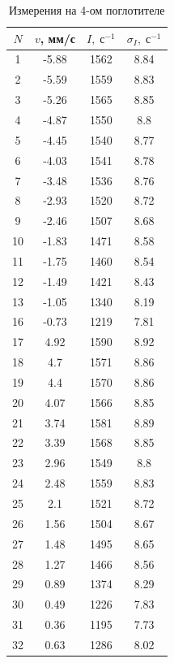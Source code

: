 \documentclass[12pt]{kiarticle}
\begin{document}
	\begin{table}[h!]
		\caption{Измерения на 4-ом поглотителе}
		\begin{center}
			\begin{tabular}{|c|c|c|c|}
				\hline
				$ N  $ & $ v $, мм/с &  $ I, \; с^{-1} $ & $ \sigma_I, \; с^{-1} $  \\
				\hline
				1 & -5.88 & 1562 & 8.84 \\
				2 & -5.59 & 1559 & 8.83 \\
				3 & -5.26 & 1565 & 8.85 \\
				4 & -4.87 & 1550 & 8.8 \\
				5 & -4.45 & 1540 & 8.77 \\
				6 & -4.03 & 1541 & 8.78 \\
				7 & -3.48 & 1536 & 8.76 \\
				8 & -2.93 & 1520 & 8.72 \\
				9 & -2.46 & 1507 & 8.68 \\
				10 & -1.83 & 1471 & 8.58 \\
				11 & -1.75 & 1460 & 8.54 \\
				12 & -1.49 & 1421 & 8.43 \\
				13 & -1.05 & 1340 & 8.19 \\
				16 & -0.73 & 1219 & 7.81 \\
				17 & 4.92 & 1590 & 8.92 \\
				18 & 4.7 & 1571 & 8.86 \\
				19 & 4.4 & 1570 & 8.86 \\
				20 & 4.07 & 1566 & 8.85 \\
				21 & 3.74 & 1581 & 8.89 \\
				22 & 3.39 & 1568 & 8.85 \\
				23 & 2.96 & 1549 & 8.8 \\
				24 & 2.48 & 1559 & 8.83 \\
				25 & 2.1 & 1521 & 8.72 \\
				26 & 1.56 & 1504 & 8.67 \\
				27 & 1.48 & 1495 & 8.65 \\
				28 & 1.27 & 1466 & 8.56 \\
				29 & 0.89 & 1374 & 8.29 \\
				30 & 0.49 & 1226 & 7.83 \\
				31 & 0.36 & 1195 & 7.73 \\
				32 & 0.63 & 1286 & 8.02 \\
				\hline
			\end{tabular}
		\end{center}
		\label{table_4}
	\end{table}

	
\end{document}
